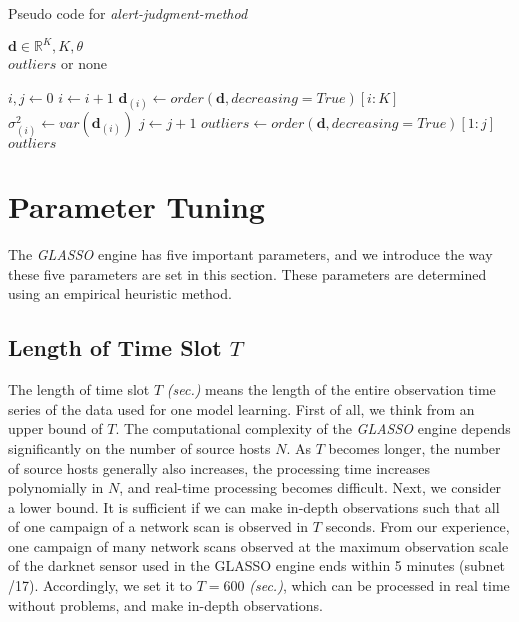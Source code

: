 \documentclass[conference]{IEEEtran}
\begin{document}
\begin{algorithm}[tb]
\caption{Pseudo code for {\it alert-judgment-method}}
\label{alg2}
\begin{algorithmic}[1]
  \REQUIRE $\bm{d}\in\mathbb{R}^{K}, K, \theta$\\
  \ENSURE $outliers$ or none

  \STATE $i, j \gets 0$
    \STATE $i \gets i + 1$
    \STATE $\bm{d}_{(i)} \gets order(\bm{d}, decreasing=True)[i:K]$
    \STATE $\sigma_{(i)}^2 \gets var(\bm{d}_{(i)})$
      \STATE $j \gets j + 1$
    \ELSE
      \STATE $outliers \gets order(\bm{d}, decreasing=True)[1:j]$
      \RETURN $outliers$
    \ENDIF
  \ENDWHILE
\end{algorithmic}
\end{algorithm}


\section{Parameter Tuning}
The {\it GLASSO} engine has five important parameters, and we introduce the way these five parameters are set in this section.
These parameters are determined using an empirical heuristic method.


\subsection{Length of Time Slot $T$}
The length of time slot $T$ {\it (sec.)} means the length of the entire observation time series of the data used for one model learning.
First of all, we think from an upper bound of $T$.
The computational complexity of the {\it GLASSO} engine depends significantly on the number of source hosts $N$.
As $T$ becomes longer, the number of source hosts generally also increases, the processing time increases polynomially in $N$, and real-time processing becomes difficult.
Next, we consider a lower bound.
It is sufficient if we can make in-depth observations such that all of one campaign of a network scan is observed in $T$ seconds.
From our experience, one campaign of many network scans observed at the maximum observation scale of the darknet sensor used in the GLASSO engine ends within 5 minutes (subnet /17).
Accordingly, we set it to $T=600$ {\it (sec.)}, which can be processed in real time without problems, and make in-depth observations.
\end{document}
